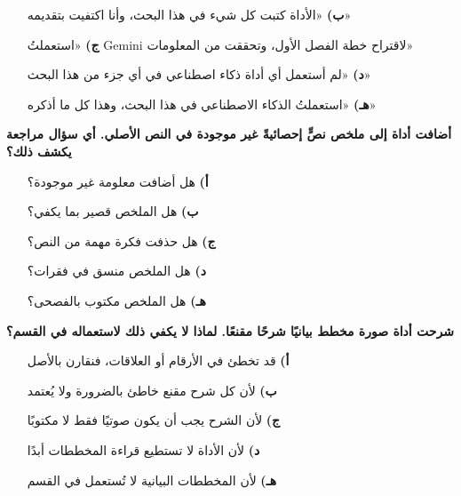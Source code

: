 \documentclass[11pt,a4paper]{article}
\begin{document}
\begin{multicols}{2}
\begin{minipage}{\linewidth}
\begin{itemize}[leftmargin=0.95cm, labelsep=4pt, itemsep=0pt, topsep=2pt, parsep=0pt]
  \item[\textbf{ب)}] «الأداة كتبت كل شيء في هذا البحث، وأنا اكتفيت بتقديمه»
  \item[\textbf{ج)}] «استعملتُ \textenglish{Gemini} لاقتراح خطة الفصل الأول، وتحققت من المعلومات»
  \item[\textbf{د)}] «لم أستعمل أي أداة ذكاء اصطناعي في أي جزء من هذا البحث»
  \item[\textbf{هـ)}] «استعملتُ الذكاء الاصطناعي في هذا البحث، وهذا كل ما أذكره»
\end{itemize}
\end{minipage}\par\vspace{7pt plus 4pt}
\noindent\begin{minipage}{\linewidth}
\hangindent=0.7cm\textbf{أضافت أداة إلى ملخص نصٍّ إحصائيةً غير موجودة في النص الأصلي. أي سؤال مراجعة يكشف ذلك؟}
\begin{itemize}[leftmargin=0.95cm, labelsep=4pt, itemsep=0pt, topsep=2pt, parsep=0pt]
  \item[\textbf{أ)}] هل أضافت معلومة غير موجودة؟
  \item[\textbf{ب)}] هل الملخص قصير بما يكفي؟
  \item[\textbf{ج)}] هل حذفت فكرة مهمة من النص؟
  \item[\textbf{د)}] هل الملخص منسق في فقرات؟
  \item[\textbf{هـ)}] هل الملخص مكتوب بالفصحى؟
\end{itemize}
\end{minipage}\par\vspace{7pt plus 4pt}
\noindent\begin{minipage}{\linewidth}
\hangindent=0.7cm\textbf{شرحت أداة صورة مخطط بيانيًا شرحًا مقنعًا. لماذا لا يكفي ذلك لاستعماله في القسم؟}
\begin{itemize}[leftmargin=0.95cm, labelsep=4pt, itemsep=0pt, topsep=2pt, parsep=0pt]
  \item[\textbf{أ)}] قد تخطئ في الأرقام أو العلاقات، فنقارن بالأصل
  \item[\textbf{ب)}] لأن كل شرح مقنع خاطئ بالضرورة ولا يُعتمد
  \item[\textbf{ج)}] لأن الشرح يجب أن يكون صوتيًا فقط لا مكتوبًا
  \item[\textbf{د)}] لأن الأداة لا تستطيع قراءة المخططات أبدًا
  \item[\textbf{هـ)}] لأن المخططات البيانية لا تُستعمل في القسم
\end{itemize}
\end{minipage}\par\vspace{7pt plus 4pt}
\end{multicols}
\end{document}
